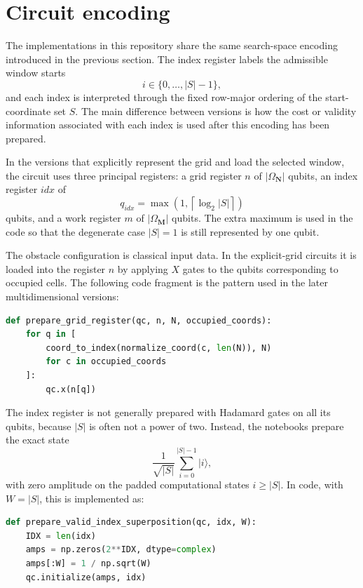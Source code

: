 \section{Circuit encoding}

The implementations in this repository share the same search-space encoding introduced in the previous section.  The index register labels the admissible window starts
\[
    i \in \{0,\ldots,|S|-1\},
\]
and each index is interpreted through the fixed row-major ordering of the start-coordinate set \(S\).  The main difference between versions is how the cost or validity information associated with each index is used after this encoding has been prepared.

In the versions that explicitly represent the grid and load the selected window, the circuit uses three principal registers: a grid register \(n\) of \(|\Omega_{\mathbf N}|\) qubits, an index register \(idx\) of
\[
    q_{idx}
    =
    \max\left(1,\left\lceil \log_2 |S| \right\rceil\right)
\]
qubits, and a work register \(m\) of \(|\Omega_{\mathbf M}|\) qubits.  The extra maximum is used in the code so that the degenerate case \(|S|=1\) is still represented by one qubit.

The obstacle configuration is classical input data.  In the explicit-grid circuits it is loaded into the register \(n\) by applying \(X\) gates to the qubits corresponding to occupied cells.  The following code fragment is the pattern used in the later multidimensional versions:

\begin{lstlisting}[language=Python, caption={Classical obstacle loading into the grid register.}]
def prepare_grid_register(qc, n, N, occupied_coords):
    for q in [
        coord_to_index(normalize_coord(c, len(N)), N)
        for c in occupied_coords
    ]:
        qc.x(n[q])
\end{lstlisting}

The index register is not generally prepared with Hadamard gates on all its qubits, because \(|S|\) is often not a power of two.  Instead, the notebooks prepare the exact state
\begin{equation}
    \frac{1}{\sqrt{|S|}}
    \sum_{i = 0}^{|S| - 1}
    |i\rangle,
\end{equation}
with zero amplitude on the padded computational states \(i \geq |S|\).  In code, with \(W=|S|\), this is implemented as:

\begin{lstlisting}[language=Python, caption={Valid-index state preparation.}]
def prepare_valid_index_superposition(qc, idx, W):
    IDX = len(idx)
    amps = np.zeros(2**IDX, dtype=complex)
    amps[:W] = 1 / np.sqrt(W)
    qc.initialize(amps, idx)
\end{lstlisting}

